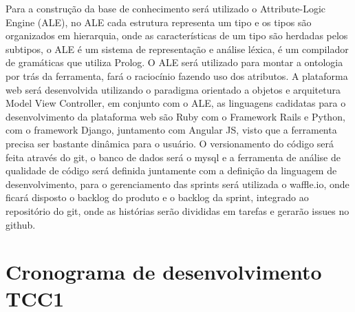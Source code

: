 Para a construção da base de conhecimento será utilizado o Attribute-Logic Engine (ALE), no ALE cada estrutura representa um tipo e os tipos são organizados em hierarquia, onde as características de um tipo são herdadas pelos subtipos, o ALE é um sistema de representação e análise léxica, é um compilador de gramáticas que utiliza Prolog. O ALE será utilizado para montar a ontologia por trás da ferramenta, fará o raciocínio fazendo uso dos atributos.
A plataforma web será desenvolvida utilizando o paradigma orientado a objetos e arquitetura Model View Controller, em conjunto com o ALE, as linguagens cadidatas para o desenvolvimento da plataforma web são Ruby com o Framework Rails e Python, com o framework Django, juntamento com Angular JS, visto que a ferramenta precisa ser bastante dinâmica para o usuário. O versionamento do código será feita através do git, o banco de dados será o mysql e a ferramenta de análise de qualidade de código será definida juntamente com a definição da linguagem de desenvolvimento, para o gerenciamento das sprints será utilizada o waffle.io, onde ficará disposto o backlog do produto e o backlog da sprint, integrado ao repositório do git, onde as histórias serão divididas em tarefas e gerarão issues no github.


\section{Cronograma de desenvolvimento TCC1}



